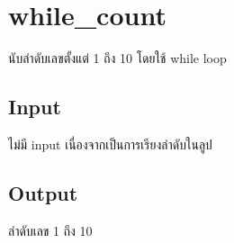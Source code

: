 \documentclass{article}
\begin{document}
\section*{while_count}

นับลำดับเลขตั้งแต่ 1 ถึง 10 โดยใช้ while loop\\



\subsection*{Input}
{ไม่มี input เนื่องจากเป็นการเรียงลำดับในลูป}\\



\subsection*{Output}
ลำดับเลข 1 ถึง 10
\end{document}
